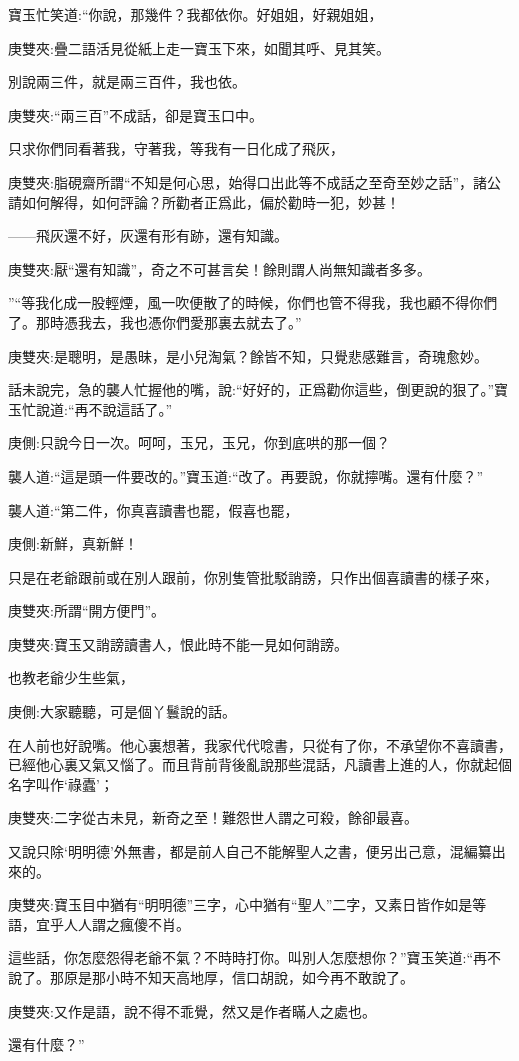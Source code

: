 \begin{parag}
    寶玉忙笑道:“你說，那幾件？我都依你。好姐姐，好親姐姐，\begin{note}庚雙夾:疊二語活見從紙上走一寶玉下來，如聞其呼、見其笑。\end{note}別說兩三件，就是兩三百件，我也依。\begin{note}庚雙夾:“兩三百”不成話，卻是寶玉口中。\end{note}只求你們同看著我，守著我，等我有一日化成了飛灰，\begin{note}庚雙夾:脂硯齋所謂“不知是何心思，始得口出此等不成話之至奇至妙之話”，諸公請如何解得，如何評論？所勸者正爲此，偏於勸時一犯，妙甚！\end{note}——飛灰還不好，灰還有形有跡，還有知識。\begin{note}庚雙夾:厭“還有知識”，奇之不可甚言矣！餘則謂人尚無知識者多多。\end{note}”“等我化成一股輕煙，風一吹便散了的時候，你們也管不得我，我也顧不得你們了。那時憑我去，我也憑你們愛那裏去就去了。”\begin{note}庚雙夾:是聰明，是愚昧，是小兒淘氣？餘皆不知，只覺悲感難言，奇瑰愈妙。\end{note}話未說完，急的襲人忙握他的嘴，說:“好好的，正爲勸你這些，倒更說的狠了。”寶玉忙說道:“再不說這話了。”\begin{note}庚側:只說今日一次。呵呵，玉兄，玉兄，你到底哄的那一個？\end{note}襲人道:“這是頭一件要改的。”寶玉道:“改了。再要說，你就擰嘴。還有什麼？”
\end{parag}


\begin{parag}
    襲人道:“第二件，你真喜讀書也罷，假喜也罷，\begin{note}庚側:新鮮，真新鮮！\end{note}只是在老爺跟前或在別人跟前，你別隻管批駁誚謗，只作出個喜讀書的樣子來，\begin{note}庚雙夾:所謂“開方便門”。\end{note}\begin{note}庚雙夾:寶玉又誚謗讀書人，恨此時不能一見如何誚謗。\end{note}也教老爺少生些氣，\begin{note}庚側:大家聽聽，可是個丫鬟說的話。\end{note}在人前也好說嘴。他心裏想著，我家代代唸書，只從有了你，不承望你不喜讀書，已經他心裏又氣又惱了。而且背前背後亂說那些混話，凡讀書上進的人，你就起個名字叫作‘祿蠹’；\begin{note}庚雙夾:二字從古未見，新奇之至！難怨世人謂之可殺，餘卻最喜。\end{note}又說只除‘明明德’外無書，都是前人自己不能解聖人之書，便另出己意，混編纂出來的。\begin{note}庚雙夾:寶玉目中猶有“明明德”三字，心中猶有“聖人”二字，又素日皆作如是等語，宜乎人人謂之瘋傻不肖。\end{note}這些話，你怎麼怨得老爺不氣？不時時打你。叫別人怎麼想你？”寶玉笑道:“再不說了。那原是那小時不知天高地厚，信口胡說，如今再不敢說了。\begin{note}庚雙夾:又作是語，說不得不乖覺，然又是作者瞞人之處也。\end{note}還有什麼？”
\end{parag}


